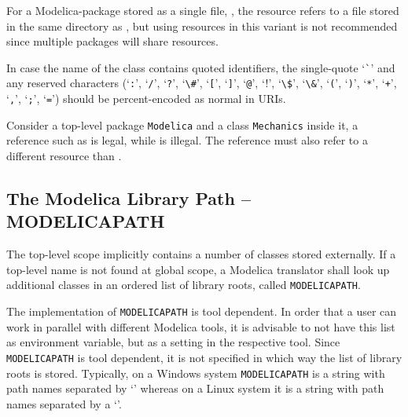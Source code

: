 For a Modelica-package stored as a single file, , the resource
 refers to a file  stored in the same
directory as , but using resources in this variant is not
recommended since multiple packages will share resources.

In case the name of the class contains quoted identifiers, the single-quote `\lstinline!`!'
and any reserved characters (`\lstinline!:!', `\lstinline!/!', `\lstinline!?!', `\lstinline!\#!', `\lstinline![!',
`\lstinline!]!', `\lstinline!@!', `\lstinline!!!', `\lstinline[mathescape=false]!\$!', `\lstinline!\&!', `\lstinline!(!', `\lstinline!)!', `\lstinline!*!', `\lstinline!+!',
`\lstinline!,!', `\lstinline!;!', `\lstinline!=!') should be percent-encoded as normal in URIs.

\begin{example}
Consider a top-level package \lstinline!Modelica! and a class
\lstinline!Mechanics! inside it, a reference such as
 is legal, while
 is illegal. The reference
 must also refer to a different
resource than .
\end{example}

\subsection{The Modelica Library Path -- MODELICAPATH}\label{the-modelica-library-path-modelicapath}

The top-level scope implicitly contains a number of classes stored
externally. If a top-level name is not found at global scope, a Modelica
translator shall look up additional classes in an ordered list of
library roots, called \lstinline!MODELICAPATH!.

\begin{nonnormative}
The implementation of \lstinline!MODELICAPATH! is tool dependent.  In order that a user can work in parallel with different Modelica tools, it is advisable to not
have this list as environment variable, but as a setting in the respective tool.  Since \lstinline!MODELICAPATH! is tool dependent, it is not specified in which way
the list of library roots is stored.  Typically, on a Windows system \lstinline!MODELICAPATH! is a string with path names separated by `\filename{;}' whereas on a Linux system
it is a string with path names separated by a `\filename{:}'.
\end{nonnormative}


